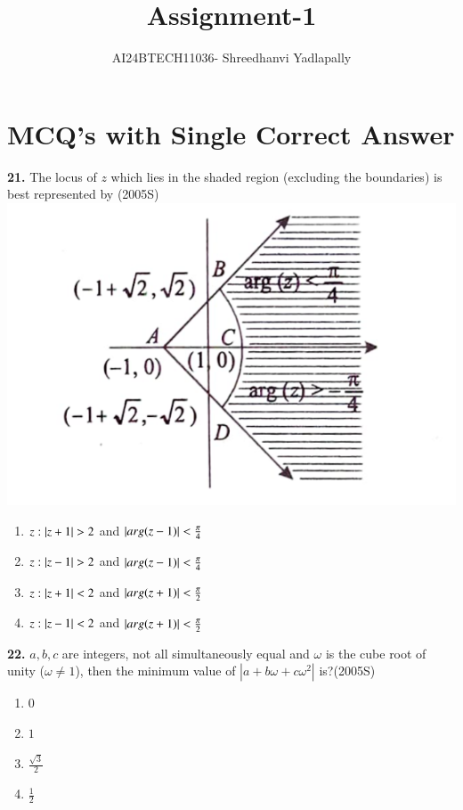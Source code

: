 \documentclass[journal,12pt,twocolumn]{IEEEtran}
\theoremstyle{remark}
\begin{document}

\vspace{3cm}

\title{Assignment-1}
\author{AI24BTECH11036- Shreedhanvi Yadlapally}
\maketitle
\newpage
\bigskip
\section{MCQ's with Single Correct Answer}
\textbf{21.} The locus of $z$ which lies in the shaded region (excluding the boundaries) is best represented by \hfill{(2005S)}\\
\includegraphics[scale=0.2]{Screenshot_20240807-085214}
\begin{enumerate}[label=(\alph*)]
\item $z:\left\vert z+1\right\vert>2$ and  $\left\vert arg(z-1)\right\vert<\frac{\pi}{4}$
\item $z:\left\vert z-1\right\vert>2$ and $\left\vert arg(z-1)\right\vert<\frac{\pi}{4}$
\item $z:\left\vert z+1\right\vert<2$ and $\left\vert arg(z+1)\right\vert<\frac{\pi}{2}$
\item $z:\left\vert z-1\right\vert<2$ and $\left\vert arg(z+1)\right\vert<\frac{\pi}{2}$
\end{enumerate}
\textbf{22.} $a,b,c$ are integers, not all simultaneously equal and $\omega$ is the cube root of unity ($\omega \neq 1$), then the minimum value of $|a+b\omega+c\omega^{2}|$ is?\hfill{(2005S)}
\begin{enumerate}[label=(\alph*)]
	\item $0$
	\item $1$
	\item $\frac{\sqrt{3}}{2}$
	\item $\frac{1}{2}$
\end{enumerate}
\end{document}
